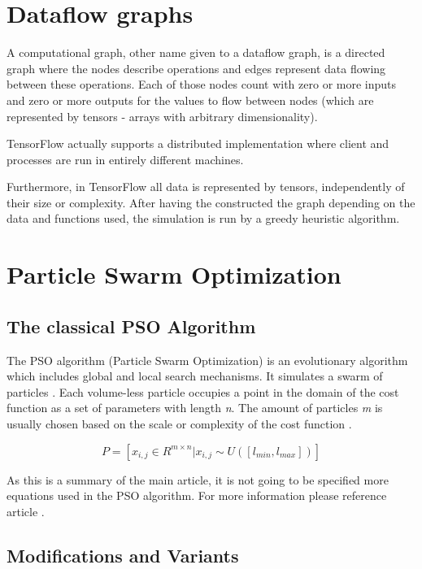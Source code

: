 \documentclass[10pt]{article}
\begin{document}
\section{Dataflow graphs}

A computational graph, other name given to a dataflow graph, is a directed graph
where the nodes describe operations and edges represent data flowing between
these operations. Each of those nodes count with zero or more inputs and zero or
more outputs for the values to flow between nodes (which are represented by
tensors - arrays with arbitrary dimensionality).

TensorFlow actually supports a distributed implementation where client and
processes are run in entirely different machines.

Furthermore, in TensorFlow all data is represented by tensors, independently of
their size or complexity. After having the constructed the graph depending on
the data and functions used, the simulation is run by a greedy heuristic
algorithm.

\section{Particle Swarm Optimization}

\subsection{The classical PSO Algorithm}

The PSO algorithm (Particle Swarm Optimization) is an evolutionary algorithm 
which includes global and local search mechanisms. It simulates a swarm of
particles \cite{particleswarm}. Each volume-less particle occupies a point in the domain of the cost
function  as a set of parameters with length \emph{n}. The amount of particles
\emph{m} is usually chosen based on the scale or complexity of the cost function
\cite{artgpo}.

\begin{equation}
P = [x_{i,j} \in R^{m \times n} | x_{i,j} \sim U([l_{min}, l_{max}])]
\end{equation}

As this is a summary of the main article, it is not going to be specified more
equations used in the PSO algorithm. For more information please reference
article \cite{artgpo}.

\subsection{Modifications and Variants}
\end{document}
